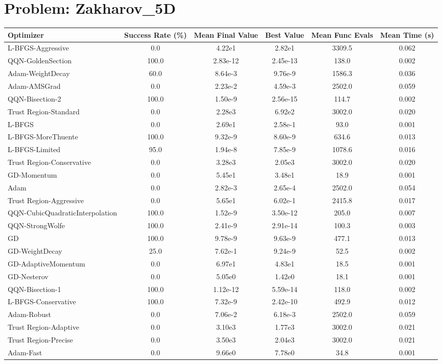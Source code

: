 \documentclass{article}
\begin{document}
\section{Problem: Zakharov\_5D}
\begin{longtable}{p{3cm}*{5}{c}}
\toprule
\textbf{Optimizer} & \textbf{Success Rate (\%)} & \textbf{Mean Final Value} & \textbf{Best Value} & \textbf{Mean Func Evals} & \textbf{Mean Time (s)} \\
\midrule
L-BFGS-Aggressive & 0.0 & 4.22e1 & 2.82e1 & 3309.5 & 0.062 \\
QQN-GoldenSection & 100.0 & 2.83e-12 & 2.45e-13 & 138.0 & 0.002 \\
Adam-WeightDecay & 60.0 & 8.64e-3 & 9.76e-9 & 1586.3 & 0.036 \\
Adam-AMSGrad & 0.0 & 2.23e-2 & 4.59e-3 & 2502.0 & 0.059 \\
QQN-Bisection-2 & 100.0 & 1.50e-9 & 2.56e-15 & 114.7 & 0.002 \\
Trust Region-Standard & 0.0 & 2.28e3 & 6.92e2 & 3002.0 & 0.020 \\
L-BFGS & 0.0 & 2.69e1 & 2.58e-1 & 93.0 & 0.001 \\
L-BFGS-MoreThuente & 100.0 & 9.32e-9 & 8.60e-9 & 634.6 & 0.013 \\
L-BFGS-Limited & 95.0 & 1.94e-8 & 7.85e-9 & 1078.6 & 0.016 \\
Trust Region-Conservative & 0.0 & 3.28e3 & 2.05e3 & 3002.0 & 0.020 \\
GD-Momentum & 0.0 & 5.45e1 & 3.48e1 & 18.9 & 0.001 \\
Adam & 0.0 & 2.82e-3 & 2.65e-4 & 2502.0 & 0.054 \\
Trust Region-Aggressive & 0.0 & 5.65e1 & 6.02e-1 & 2415.8 & 0.017 \\
QQN-CubicQuadraticInterpolation & 100.0 & 1.52e-9 & 3.50e-12 & 205.0 & 0.007 \\
QQN-StrongWolfe & 100.0 & 2.41e-9 & 2.91e-14 & 100.3 & 0.003 \\
GD & 100.0 & 9.78e-9 & 9.63e-9 & 477.1 & 0.013 \\
GD-WeightDecay & 25.0 & 7.62e-1 & 9.24e-9 & 52.5 & 0.002 \\
GD-AdaptiveMomentum & 0.0 & 6.97e1 & 4.83e1 & 18.5 & 0.001 \\
GD-Nesterov & 0.0 & 5.05e0 & 1.42e0 & 18.1 & 0.001 \\
QQN-Bisection-1 & 100.0 & 1.12e-12 & 5.59e-14 & 118.0 & 0.002 \\
L-BFGS-Conservative & 100.0 & 7.32e-9 & 2.42e-10 & 492.9 & 0.012 \\
Adam-Robust & 0.0 & 7.06e-2 & 6.18e-3 & 2502.0 & 0.059 \\
Trust Region-Adaptive & 0.0 & 3.10e3 & 1.77e3 & 3002.0 & 0.021 \\
Trust Region-Precise & 0.0 & 3.50e3 & 2.04e3 & 3002.0 & 0.021 \\
Adam-Fast & 0.0 & 9.66e0 & 7.78e0 & 34.8 & 0.001 \\
\bottomrule
\end{longtable}
\end{document}
